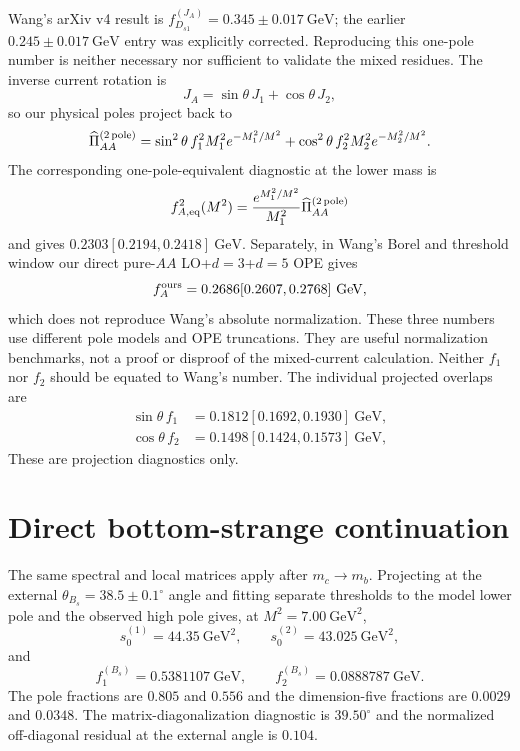 \documentclass[11pt]{article}
\newcommand{\GeV}{\mathrm{GeV}}
\begin{document}
Wang's arXiv v4 result is
$f_{D_{s1}}^{(J_A)}=0.345\pm0.017~\GeV$; the earlier
$0.245\pm0.017~\GeV$ entry was explicitly corrected.  Reproducing this
one-pole number is neither necessary nor sufficient to validate the mixed
residues.  The inverse current rotation is
\begin{equation}
J_A=\sin\theta\,J_1+\cos\theta\,J_2,
\end{equation}
so our physical poles project back to
\begin{equation}
\widehat\Pi_{AA}^{(2\,{\rm pole})}
=\sin^2\theta\,f_1^2M_1^2e^{-M_1^2/M^2}
+\cos^2\theta\,f_2^2M_2^2e^{-M_2^2/M^2}.
\end{equation}
The corresponding one-pole-equivalent diagnostic at the lower mass is
\begin{equation}
f_{A,\rm eq}^2(M^2)=
\frac{e^{M_1^2/M^2}}{M_1^2}\widehat\Pi_{AA}^{(2\,{\rm pole})}
\end{equation}
and gives $0.2303[0.2194,0.2418]~\GeV$.  Separately, in Wang's Borel and
threshold window our direct pure-$AA$ LO+$d=3$+$d=5$ OPE gives
\begin{equation}
f_A^{\rm ours}=0.2686[0.2607,0.2768]~\GeV,
\end{equation}
which does not reproduce Wang's absolute normalization.  These three numbers
use different pole models and OPE truncations.  They are useful normalization
benchmarks, not a proof or disproof of the mixed-current calculation.  Neither
$f_1$ nor $f_2$ should be equated to Wang's number.  The individual projected
overlaps are
\begin{align}
\sin\theta\,f_1&=0.1812[0.1692,0.1930]~\GeV,\\
\cos\theta\,f_2&=0.1498[0.1424,0.1573]~\GeV,
\end{align}
These are projection diagnostics only.

\section{Direct bottom-strange continuation}

The same spectral and local matrices apply after $m_c\to m_b$.  Projecting at
the external $\theta_{B_s}=38.5\pm0.1^\circ$ angle and fitting separate
thresholds to the model lower pole and the observed high pole gives, at
$M^2=7.00~\GeV^2$,
\begin{equation}
s_0^{(1)}=44.35~\GeV^2,\qquad
s_0^{(2)}=43.025~\GeV^2,
\end{equation}
and
\begin{equation}
f_1^{(B_s)}=0.5381107~\GeV,\qquad
f_2^{(B_s)}=0.0888787~\GeV .
\end{equation}
The pole fractions are $0.805$ and $0.556$ and the dimension-five fractions
are $0.0029$ and $0.0348$.  The matrix-diagonalization diagnostic is
$39.50^\circ$ and the normalized off-diagonal residual at the external angle
is $0.104$.
\end{document}
